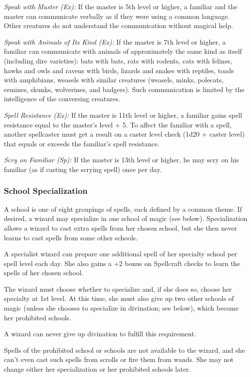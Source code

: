 \textit{Speak with Master (Ex):} If the master is 5th level or higher, a familiar and the master can communicate verbally as if they were using a common language. Other creatures do not understand the communication without magical help.

\textit{Speak with Animals of Its Kind (Ex):} If the master is 7th level or higher, a familiar can communicate with animals of approximately the same kind as itself (including dire varieties): bats with bats, rats with rodents, cats with felines, hawks and owls and ravens with birds, lizards and snakes with reptiles, toads with amphibians, weasels with similar creatures (weasels, minks, polecats, ermines, skunks, wolverines, and badgers). Such communication is limited by the intelligence of the conversing creatures.

\textit{Spell Resistance (Ex):} If the master is 11th level or higher, a familiar gains spell resistance equal to the master's level + 5. To affect the familiar with a spell, another spellcaster must get a result on a caster level check (1d20 + caster level) that equals or exceeds the familiar's spell resistance.

\textit{Scry on Familiar (Sp):} If the master is 13th level or higher, he may scry on his familiar (as if casting the scrying spell) once per day.

\subsubsection{School Specialization}
A school is one of eight groupings of spells, each defined by a common theme. If desired, a wizard may specialize in one school of magic (see below). Specialization allows a wizard to cast extra spells from her chosen school, but she then never learns to cast spells from some other schools.

A specialist wizard can prepare one additional spell of her specialty school per spell level each day. She also gains a +2 bonus on Spellcraft checks to learn the spells of her chosen school.

The wizard must choose whether to specialize and, if she does so, choose her specialty at 1st level. At this time, she must also give up two other schools of magic (unless she chooses to specialize in divination; see below), which become her prohibited schools.

A wizard can never give up divination to fulfill this requirement.

Spells of the prohibited school or schools are not available to the wizard, and she can't even cast such spells from scrolls or fire them from wands. She may not change either her specialization or her prohibited schools later.

